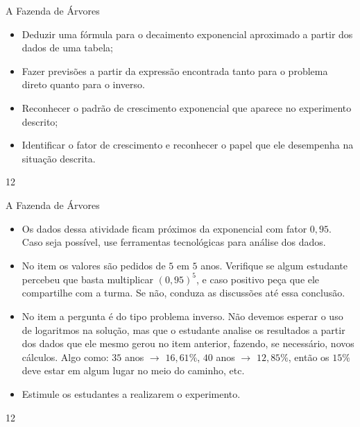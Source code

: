 \def\currentcolor{session2}
\begin{objectives}{A Fazenda de Árvores}
{
	\begin{itemize}
	\item Deduzir uma fórmula para o decaimento exponencial aproximado a partir dos dados de uma tabela;
	\item Fazer previsões a partir da expressão encontrada tanto para o problema direto quanto para o inverso.
	\end{itemize}


	\begin{itemize}
	\item Reconhecer o padrão de crescimento exponencial que aparece no experimento descrito;
	\item Identificar o fator de crescimento e reconhecer o papel que ele desempenha na situação descrita.

	\end{itemize}

}{1}{2}
\end{objectives}
\begin{sugestions}{A Fazenda de Árvores}
{
	\begin{itemize}
	\item Os dados dessa atividade ficam próximos da exponencial com fator $0{,}95$. Caso seja possível, use ferramentas tecnológicas para análise dos dados.
	\item No item  os valores são pedidos de $5$ em $5$ anos. Verifique se algum estudante percebeu que basta multiplicar $(0,95)^{5}$, e caso positivo peça que ele compartilhe com a turma. Se não, conduza as discussões até essa conclusão.
	\item No item  a pergunta é do tipo problema inverso. Não devemos esperar o uso de logaritmos na solução, mas que o estudante analise os resultados a partir dos dados que ele mesmo gerou no item anterior, fazendo, se necessário, novos cálculos. Algo como: $35$ anos $\rightarrow$ $16,61\%$, $40$ anos $\rightarrow$ $12,85\%$, então os $15\%$ deve estar em algum lugar no meio do caminho, etc.
	\end{itemize}

	\begin{itemize}
	\item Estimule os estudantes a realizarem o experimento.
	\end{itemize}
}{1}{2}
\end{sugestions}
